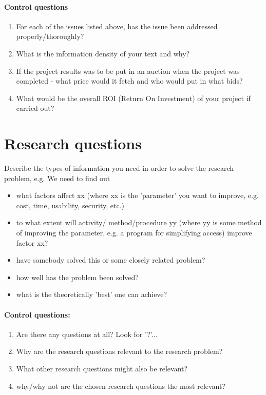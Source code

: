 \documentclass[gjovik]{gucmasterproject}
\begin{document}
\paragraph{Control questions}
\begin{enumerate}
\item For each of the issues listed above, has the issue been addressed properly/thoroughly? 
\item What is the information density of your text and why?
\item If the project results was to be put in an auction when the project was completed - what price would it fetch and who would put in what bids? 
\item What would be the overall ROI (Return On Investment) of your project if carried out?
\end{enumerate}

\section{Research questions}\label{research:questions}
Describe the types of information you need in order to solve the research problem, e.g.
We need to find out
\begin{itemize}
\item what factors affect  xx (where xx is the 'parameter' you want to improve, e.g. cost, time, usability, security, etc.)
\item to what extent will activity/ method/procedure yy (where yy is some method of improving the parameter, e.g.  a program for simplifying access) improve factor xx?
\item have somebody solved this or some closely related problem?
\item how well has the problem been solved?
\item what is the theoretically 'best' one can achieve?
\end{itemize}

\paragraph{Control questions:}
\begin{enumerate}
\item Are there any questions at all? Look for '?'...
\item Why are the research questions relevant to the research problem?
\item What other research questions might also be relevant?
\item why/why not are the chosen research questions the most relevant?
\end{enumerate}
\end{document}
